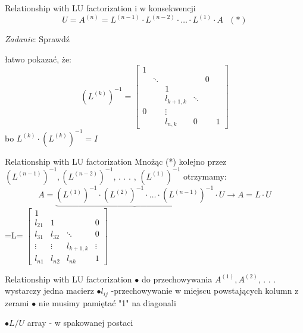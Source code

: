 \begin{frame}{Relationship with LU factorization}
i w konsekwencji
$$
U=A^{(n)}=L^{(n-1)}\cdot L^{(n-2)}\cdot\ldots\cdot L^{(1)}\cdot A \ \ \ (*)
$$
\begin{flushright}
{\it Zadanie}: Sprawdź
\end{flushright}
łatwo pokazać, że:
$$
(L^{(k)})^{-1}=\begin{bmatrix}
1 \\
 & \ddots & & & 0 \\
 & & 1\\
 & &   l_{k+1,k}  & \ddots\\
 0 & &  \vdots \\
 & & l_{n,k} &  0  & & 1

\end{bmatrix}
$$
bo $L^{(k)}\cdot(L^{(k)})^{-1}=I$
\end{frame}
\begin{frame}{Relationship with LU factorization}
Mnożąc (*) kolejno przez $(L^{(n-1)})^{-1}, (L^{(n-2)})^{-1}$, . . . , $(L^{(1)})^{-1}$ otrzymamy:
$$
A=\underbrace{(L^{(1)})^{-1}\cdot(L^{(2)})^{-1}\cdot\ldots\cdot(L^{(n-1)})^{-1}}\cdot U\rightarrow A=L\cdot U
$$
\hspace{17mm}
=L=
$
\begin{bmatrix}
1 & & & \\
l_{21}  & 1 & & 0 \\
l_{31} & l_{32} & \ddots & 0 \\
\vdots & \vdots & l_{k+1,k} & \vdots \\
l_{n1} & l_{n2} & l_{nk} & 1
\end{bmatrix}
$
\end{frame}
\begin{frame}{Relationship with LU factorization}
$\bullet$ do przechowywania $A^{(1)}, A^{(2)}$, . . . wystarczy jedna macierz \newline
$\bullet l_{ij}$ -przechowywanie w miejscu powstających kolumn z zerami \newline
$\bullet$ nie musimy pamiętać "1" na diagonali

$\bullet L/U$ array - w spakowanej postaci
\end{frame}
